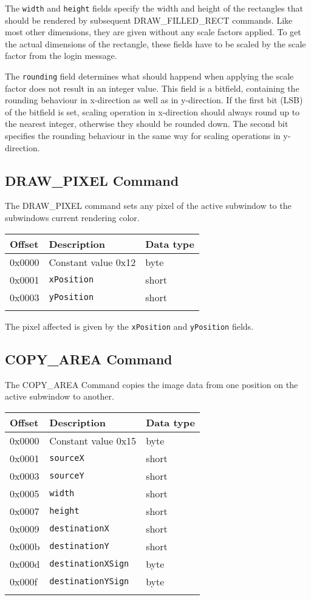 \documentclass{article}
\newcommand{\field}[1]{\textcolor{fieldColor}{\texttt{#1}}}
\newenvironment{bytelisting}
{\ttfamily \begin{center} \begin{tabular}{l l l} Offset & Description & Data type \\ \hline}
{\normalfont \end{tabular} \end{center}}
\begin{document}
The \field{width} and \field{height} fields specify the width and height of the rectangles that should be rendered by subsequent DRAW\_FILLED\_RECT commands. Like most other dimensions, they are given
without any scale factors applied. To get the actual dimensions of the rectangle, these fields have to be scaled by the scale factor from the login message.

The \field{rounding} field determines what should happend when applying the scale factor does not result in an integer value. This field is a bitfield, containing the rounding behaviour in 
x-direction as well as in y-direction. If the first bit (LSB) of the bitfield is set, scaling operation in x-direction should always round up to the nearest integer, otherwise they should be
rounded down. The second bit specifies the rounding behaviour in the same way for scaling operations in y-direction.

\subsection{DRAW\_PIXEL Command}
The DRAW\_PIXEL command sets any pixel of the active subwindow to the subwindows current rendering color.

\begin{bytelisting}
0x0000 & Constant value 0x12 & byte \\
0x0001 & \field{xPosition} & short \\
0x0003 & \field{yPosition} & short \\
\end{bytelisting}

The pixel affected is given by the \field{xPosition} and \field{yPosition} fields.

\subsection{COPY\_AREA Command}
The COPY\_AREA Command copies the image data from one position on the active subwindow to another.

\begin{bytelisting}
0x0000 & Constant value 0x15 & byte \\
0x0001 & \field{sourceX} & short \\
0x0003 & \field{sourceY} & short \\
0x0005 & \field{width} & short \\
0x0007 & \field{height} & short \\
0x0009 & \field{destinationX} & short \\
0x000b & \field{destinationY} & short \\
0x000d & \field{destinationXSign} & byte \\
0x000f & \field{destinationYSign} & byte \\
\end{bytelisting}
\end{document}
